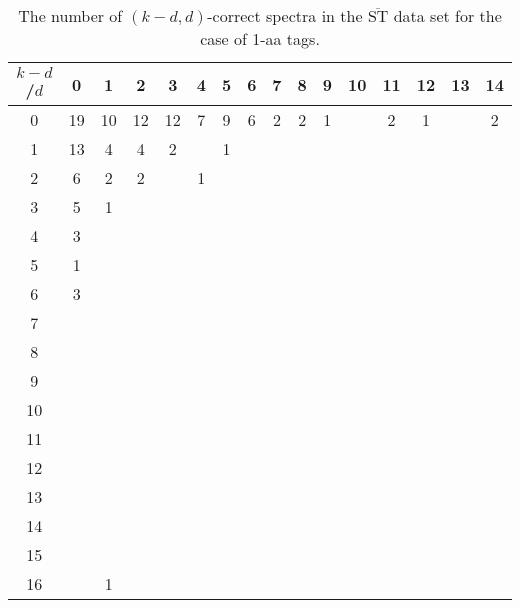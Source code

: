 \documentclass{article}[12pt]
\def\STbar{{\overline{\mathrm{ST}}}}
\begin{document}
\begin{landscape}

\begin{table}[h]\footnotesize
{\centering
\begin{tabular}{|c|c|
c|c|c|c|c|c|c|c|c|c|c|c|c|c|}
  \hline
  $k-d$/$d$ 
 & 0 & 1 & 2 & 3 & 4 & 5 & 6 & 7 & 8 & 9 & 10 & 11 & 12 & 13 & 14\\

  \hline
  \hline

0  & 19 & 10 & 12 & 12 & 7 & 9 & 6 & 2 & 2 & 1 &  & 2 & 1 &  & 2\\

1  & 13 & 4 & 4 & 2 &  & 1 &  &  &  &  &  &  &  &  & \\

2  & 6 & 2 & 2 &  & 1 &  &  &  &  &  &  &  &  &  & \\

3  & 5 & 1 &  &  &  &  &  &  &  &  &  &  &  &  & \\

4  & 3 &  &  &  &  &  &  &  &  &  &  &  &  &  & \\

5  & 1 &  &  &  &  &  &  &  &  &  &  &  &  &  & \\

6  & 3 &  &  &  &  &  &  &  &  &  &  &  &  &  & \\

7  &  &  &  &  &  &  &  &  &  &  &  &  &  &  & \\

8  &  &  &  &  &  &  &  &  &  &  &  &  &  &  & \\

9  &  &  &  &  &  &  &  &  &  &  &  &  &  &  & \\

10  &  &  &  &  &  &  &  &  &  &  &  &  &  &  & \\

11  &  &  &  &  &  &  &  &  &  &  &  &  &  &  & \\

12  &  &  &  &  &  &  &  &  &  &  &  &  &  &  & \\

13  &  &  &  &  &  &  &  &  &  &  &  &  &  &  & \\

14  &  &  &  &  &  &  &  &  &  &  &  &  &  &  & \\

15  &  &  &  &  &  &  &  &  &  &  &  &  &  &  & \\

16  &  & 1 &  &  &  &  &  &  &  &  &  &  &  &  & \\

  \hline
\end{tabular}
\par}
\centering
\caption{The number of $(k-d,d)$-correct spectra in the $\STbar$ data set for the case of 1-aa tags.}
\vspace{3mm}
\label{table:kd-1-correct-ST-bar}
\end{table}
\end{landscape}
\end{document}
